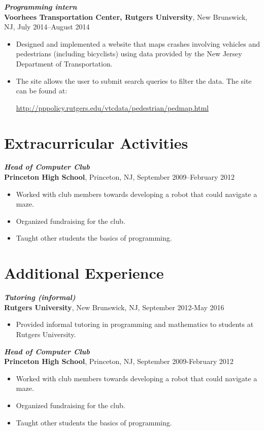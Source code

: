 \documentclass[letterpaper,12pt]{article}
\begin{document}
\textit{\textbf{Programming intern}} \\
\textbf{Voorhees Transportation Center, Rutgers University}, New Brunswick, NJ, July 2014--August 
2014
\begin{itemize}
\item
Designed and implemented a website that maps crashes involving vehicles and pedestrians (including 
bicyclists) using data provided by the New Jersey Department of Transportation.
\item
The site allows the user to submit search queries to filter the data. The site can be found at:
\begin{center}
\url{http://pppolicy.rutgers.edu/vtcdata/pedestrian/pedmap.html}
\end{center}
\end{itemize}

\section*{Extracurricular Activities}

\textit{\textbf{Head of Computer Club}} \\
\textbf{Princeton High School}, Princeton, NJ, September 2009--February 2012
\begin{itemize}
\item
Worked with club members towards developing a robot that could navigate a maze.
\item
Organized fundraising for the club.
\item
Taught other students the basics of programming.
\end{itemize}

\iffalse

\section*{Additional Experience}

\textit{\textbf{Tutoring (informal)}} \\
\textbf{Rutgers University}, New Brunswick, NJ, September 2012-May 2016
\begin{itemize}
\item
Provided informal tutoring in programming and mathematics to students at Rutgers University.
\end{itemize}

\textit{\textbf{Head of Computer Club}} \\
\textbf{Princeton High School}, Princeton, NJ, September 2009-February 2012
\begin{itemize}
\item
Worked with club members towards developing a robot that could navigate a maze.
\item
Organized fundraising for the club.
\item
Taught other students the basics of programming.
\end{itemize}
\end{document}
